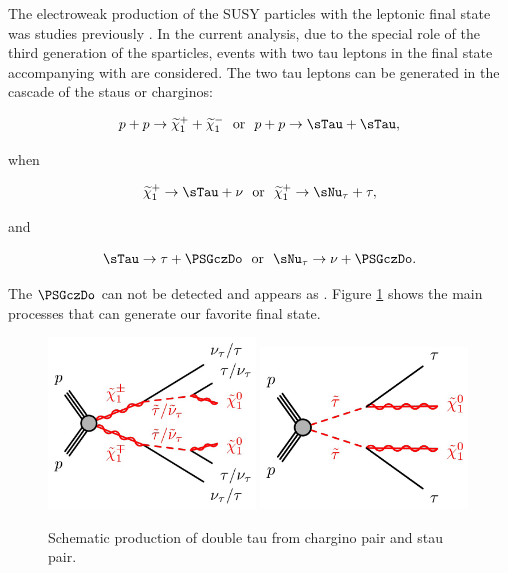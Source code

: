 The electroweak production of the SUSY particles with the leptonic final state was studies previously \cite{Khachatryan:2014qwa}.
In the current analysis, due to the special role of the third generation of the sparticles, events with two tau leptons in the final state 
accompanying with \MET are considered.
The two tau leptons can be generated in the cascade of the staus or charginos:
\begin{linenomath}
\begin{equation}
p + p \rightarrow \PSGcpDo +\PSGcmDo ~~\mathrm{or}~~  p + p \rightarrow \sTau + \sTau,
\end{equation}
\end{linenomath}
when 
\begin{linenomath}
\begin{equation}
\PSGcpDo \rightarrow \sTau + \nu ~~\mathrm{or}~~  \PSGcpDo \rightarrow \sNu_{\tau} + \tau,
\end{equation}
\end{linenomath}
and 
\begin{linenomath}
\begin{equation}
\sTau \rightarrow \tau + \PSGczDo ~~\mathrm{or}~~  \sNu_{\tau} \rightarrow \nu + \PSGczDo.
\end{equation}
\end{linenomath}
The $\PSGczDo$ can not be detected and appears as \MET.
Figure \ref{fig:Productions} shows the main processes that can generate our favorite final state.
\begin{figure}[!Hhtb]
\centering
\includegraphics[width=0.49\textwidth]{Introductionfigs/DiChargino.png}
\includegraphics[width=0.49\textwidth]{Introductionfigs/DiSTau.png}
\caption{Schematic production of double tau from chargino pair and stau pair.}
\label{fig:Productions}
\end{figure}
